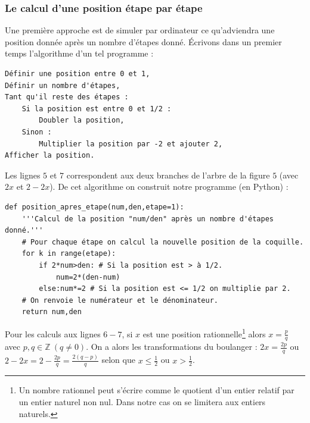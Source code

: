 \documentclass[a4paper,french,12pt]{article}
\begin{document}

\subsubsection{Le calcul d'une position étape par étape}

Une première approche est de simuler par ordinateur ce qu'adviendra une position donnée après un nombre d'étapes donné. Écrivons dans un premier temps l'algorithme d'un tel programme :

\begin{center}
\begin{verbatim}
Définir une position entre 0 et 1,
Définir un nombre d'étapes,
Tant qu'il reste des étapes :
    Si la position est entre 0 et 1/2 :
        Doubler la position,
    Sinon :
        Multiplier la position par -2 et ajouter 2,
Afficher la position.
\end{verbatim}
\end{center}

Les lignes $5$ et $7$ correspondent aux deux branches de l'arbre de la figure $5$ (avec $2x$ et $2-2x$). De cet algorithme on construit notre programme (en Python) :

\vspace*{-0.5cm}

\begin{center}
\begin{verbatim}
def position_apres_etape(num,den,etape=1):
    '''Calcul de la position "num/den" après un nombre d'étapes donné.'''
    # Pour chaque étape on calcul la nouvelle position de la coquille.
    for k in range(etape):
        if 2*num>den: # Si la position est > à 1/2.
            num=2*(den-num)
        else:num*=2 # Si la position est <= 1/2 on multiplie par 2.
    # On renvoie le numérateur et le dénominateur.
    return num,den
\end{verbatim}
\end{center}

Pour les calculs aux lignes $6-7$, si $x$ est une position rationnelle\footnote{Un nombre rationnel peut s'écrire comme le quotient d'un entier relatif par un entier naturel non nul. Dans notre cas on se limitera aux entiers naturels.} alors $x=\frac{p}{q}$ avec $p,q\in\mathbb{Z}\ \left(q\not=0\right)$. On a alors les transformations du boulanger : $2x=\frac{2p}{q}$ ou $2-2x=2-\frac{2p}{q}=\frac{2\left(q-p\right)}{q}$ selon que $x\leqslant\frac{1}{2}$ ou $x>\frac{1}{2}$.
\end{document}
